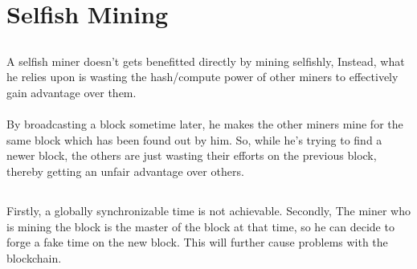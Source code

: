 \section{Selfish Mining}

\subsection{}
A selfish miner doesn't gets benefitted directly by mining selfishly, Instead, what he relies upon is wasting the hash/compute power of other miners to effectively gain advantage over them. \\ \\
By broadcasting a block sometime later, he makes the other miners mine for the same block which has been found out by him. So, while he's trying to find a newer block, the others are just wasting their efforts on the previous block, thereby getting an unfair advantage over others.
\subsection{}
Firstly, a globally synchronizable time is not achievable. Secondly, The miner who is mining the block is the master of the block at that time, so he can decide to forge a fake time on the new block. This will further cause problems with the blockchain. 
